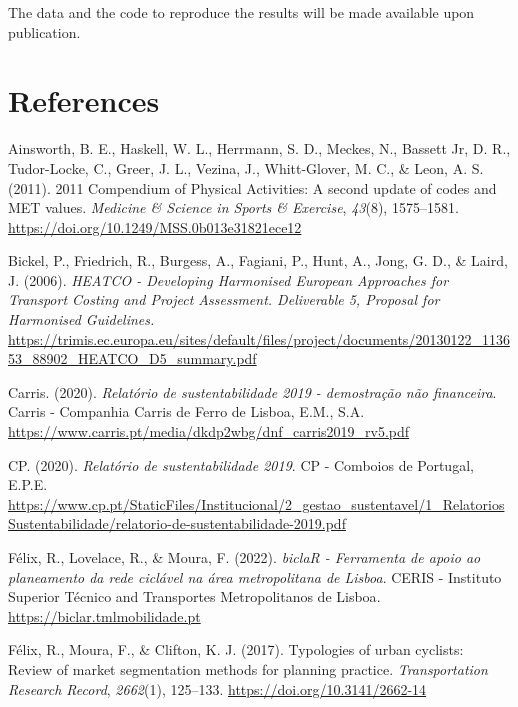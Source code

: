 \documentclass[review, doubleblind, 3p,
authoryear]{elsarticle} %
\newlength{\cslhangindent}
\newlength{\cslentryspacingunit} %
\newenvironment{CSLReferences}[2] %
 {%
  \setlength{\parindent}{0pt}
  \ifodd #1
  \let\oldpar\par
  \def\par{\hangindent=\cslhangindent\oldpar}
  \fi
  \setlength{\parskip}{#2\cslentryspacingunit}
 }%
 {}
\begin{document}
The data and the code to reproduce the results will be made available
upon publication.

\hypertarget{references}{%
\section*{References}\label{references}}

\hypertarget{refs}{}
\begin{CSLReferences}{1}{0}
\leavevmode{}%
Ainsworth, B. E., Haskell, W. L., Herrmann, S. D., Meckes, N., Bassett
Jr, D. R., Tudor-Locke, C., Greer, J. L., Vezina, J., Whitt-Glover, M.
C., \& Leon, A. S. (2011). {2011 Compendium of Physical Activities: A
second update of codes and MET values}. \emph{Medicine \& Science in
Sports \& Exercise}, \emph{43}(8), 1575--1581.
\url{https://doi.org/10.1249/MSS.0b013e31821ece12}

\leavevmode{}%
Bickel, P., Friedrich, R., Burgess, A., Fagiani, P., Hunt, A., Jong, G.
D., \& Laird, J. (2006). \emph{{HEATCO - Developing Harmonised European
Approaches for Transport Costing and Project Assessment. Deliverable 5,
Proposal for Harmonised Guidelines.}}
\url{https://trimis.ec.europa.eu/sites/default/files/project/documents/20130122_113653_88902_HEATCO_D5_summary.pdf}

\leavevmode{}%
Carris. (2020). \emph{Relatório de sustentabilidade 2019 - demostração
não financeira}. {Carris - Companhia Carris de Ferro de Lisboa, E.M.,
S.A.} \url{https://www.carris.pt/media/dkdp2wbg/dnf_carris2019_rv5.pdf}

\leavevmode{}%
CP. (2020). \emph{Relatório de sustentabilidade 2019}. {CP - Comboios de
Portugal, E.P.E.}
\url{https://www.cp.pt/StaticFiles/Institucional/2_gestao_sustentavel/1_RelatoriosSustentabilidade/relatorio-de-sustentabilidade-2019.pdf}

\leavevmode{}%
Félix, R., Lovelace, R., \& Moura, F. (2022). \emph{{biclaR - Ferramenta
de apoio ao planeamento da rede ciclável na área metropolitana de
Lisboa}}. {CERIS - Instituto Superior Técnico and Transportes
Metropolitanos de Lisboa}. \url{https://biclar.tmlmobilidade.pt}

\leavevmode{}%
Félix, R., Moura, F., \& Clifton, K. J. (2017). Typologies of urban
cyclists: Review of market segmentation methods for planning practice.
\emph{Transportation Research Record}, \emph{2662}(1), 125--133.
\url{https://doi.org/10.3141/2662-14}


\end{CSLReferences}
\end{document}
